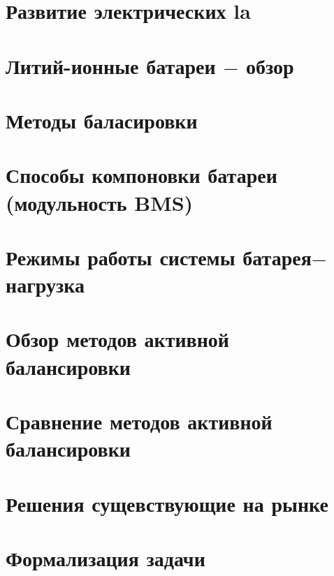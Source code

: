 \section{Развитие электрических \acs{la}}


\section{Литий-ионные батареи $-$ обзор}



\section{Методы баласировки}


\section{Способы компоновки батареи (модульность BMS)}


\section{Режимы работы системы \glqq батарея$-$нагрузка\grqq}


\section{Обзор методов активной балансировки}


\section{Сравнение методов активной балансировки}


\section{Решения сущевствующие на рынке}


\section{Формализация задачи}




% 


% 
